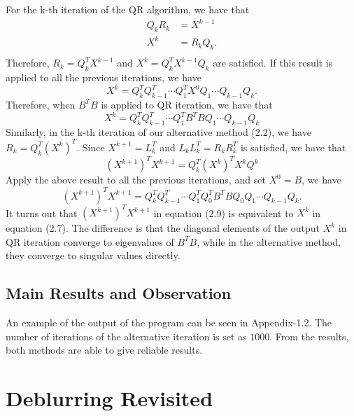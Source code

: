 For the k-th iteration of the QR algorithm, we have that
\begin{equation}\tag{2.5}
    \begin{aligned}
    Q_kR_k &= X^{k - 1} \\
    X^k &= R_kQ_k. \\
    \end{aligned}
\end{equation}
Therefore, $R_k = Q_k^T X^{k - 1}$ and $X^k = Q_k^T X^{k - 1}Q_k$ are satisfied. If this result is applied to all the previous iterations, we have
\begin{equation}\tag{2.6}
    X^k = Q_k^T Q_{k-1}^T \cdots Q_1^T X^0 Q_1 \cdots Q_{k-1} Q_k.
\end{equation}
Therefore, when $B^TB$ is applied to QR iteration, we have that 
\begin{equation}\tag{2.7}
    X^k = Q_k^T Q_{k-1}^T \cdots Q_1^T B^TB Q_1 \cdots Q_{k-1} Q_k
\end{equation}
Similarly, in the k-th iteration of our alternative method (2.2), we have $R_k = Q_k^T(X^k)^T$. Since $X^{k+1} = L_k^T$ and $L_kL_k^T = R_kR_k^T$ is satisfied, we have that 
\begin{equation}\tag{2.8}
    (X^{k+1})^TX^{k+1} = Q_k^T(X^k)^TX^kQ^k
\end{equation}
Apply the above result to all the previous iterations, and set $X^0 = B$, we have 
\begin{equation}\tag{2.9}
    (X^{k+1})^TX^{k+1} = Q_k^T Q_{k-1}^T \cdots Q_1^T Q_0^T B^TB Q_0 Q_1 \cdots Q_{k-1} Q_k.
\end{equation}
It turns out that $(X^{k+1})^TX^{k+1}$ in equation (2.9) is equivalent to $X^k$ in equation (2.7). The difference is that the diagonal elements of the output $X^k$ in QR iteration converge to eigenvalues of $B^TB$, while in the alternative method, they converge to singular values directly. 

\subsection{Main Results and Observation}
An example of the output of the program can be seen in Appendix-1.2. The number of iterations of the alternative iteration is set as $1000$. From the results, both methods are able to give reliable results. 
\section{Deblurring Revisited}
